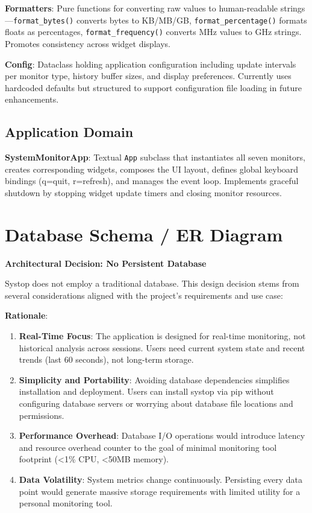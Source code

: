 \documentclass[12pt,a4paper,oneside]{report}
\begin{document}
\textbf{Formatters}: Pure functions for converting raw values to human-readable strings---\texttt{format\_bytes()} converts bytes to KB/MB/GB, \texttt{format\_percentage()} formats floats as percentages, \texttt{format\_frequency()} converts MHz values to GHz strings. Promotes consistency across widget displays.

\textbf{Config}: Dataclass holding application configuration including update intervals per monitor type, history buffer sizes, and display preferences. Currently uses hardcoded defaults but structured to support configuration file loading in future enhancements.

\subsection{Application Domain}

\textbf{SystemMonitorApp}: Textual \texttt{App} subclass that instantiates all seven monitors, creates corresponding widgets, composes the UI layout, defines global keyboard bindings (q=quit, r=refresh), and manages the event loop. Implements graceful shutdown by stopping widget update timers and closing monitor resources.

\section{Database Schema / ER Diagram}
\label{sec:database-schema}

\textbf{Architectural Decision: No Persistent Database}

Systop does not employ a traditional database. This design decision stems from several considerations aligned with the project's requirements and use case:

\textbf{Rationale}:
\begin{enumerate}
    \item \textbf{Real-Time Focus}: The application is designed for real-time monitoring, not historical analysis across sessions. Users need current system state and recent trends (last 60 seconds), not long-term storage.
    
    \item \textbf{Simplicity and Portability}: Avoiding database dependencies simplifies installation and deployment. Users can install systop via pip without configuring database servers or worrying about database file locations and permissions.
    
    \item \textbf{Performance Overhead}: Database I/O operations would introduce latency and resource overhead counter to the goal of minimal monitoring tool footprint (<1\% CPU, <50MB memory).
    
    \item \textbf{Data Volatility}: System metrics change continuously. Persisting every data point would generate massive storage requirements with limited utility for a personal monitoring tool.
\end{enumerate}
\end{document}
